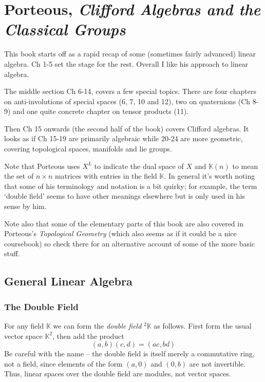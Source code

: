 \documentclass[oneside,english]{amsbook}
\numberwithin{section}{chapter}
\theoremstyle{plain}
\theoremstyle{definition}
\begin{document}
\chapter{Porteous, \emph{Clifford Algebras and the Classical Groups}}

This book starts off as a rapid recap of some (sometimes fairly advanced) linear algebra. Ch 1-5 set the stage for the rest. Overall I like his approach to linear algebra.

The middle section Ch 6-14, covers a few special topics. There are four chapters on anti-involutions of special spaces (6, 7, 10 and 12), two on quaternions (Ch 8-9) and one quite concrete chapter on tensor products (11). 

Then Ch 15 onwards (the second half of the book) covers Clifford algebras. It looks as if Ch 15-19 are primarily algebraic while 20-24 are more geometric, covering topological spaces, manifolds and lie groups.

Note that Porteous uses $X^L$ to indicate the dual space of $X$ and $\mathbb{K}(n)$ to mean the set of $n\times n$ matrices with entries in the field $\mathbb{K}$. In general it's worth noting that some of his terminology and notation is a bit quirky; for example, the term `double field' seems to have other meanings elsewhere but is only used in his sense by him. 

Note also that some of the elementary parts of this book are also covered in Porteous's \emph{Topological Geometry} (which also seems as if it could be a nice coursebook) so check there for an alternative account of some of the more basic stuff.

\section{General Linear Algebra}

\subsection{The Double Field}

For any field $\mathbb{K}$ we can form the \emph{double field} ${}^2\mathbb{K}$ as follows. First form the usual vector space $\mathbb{K}^2$, then add the product
\[
	(a, b)(c, d) = (ac, bd)
\]
Be careful with the name -- the double field is itself merely a commutative ring, not a field, since elements of the form $(a, 0)$ and $(0, b)$ are not invertible. Thus, linear spaces over the double field are modules, not vector spaces.
\end{document}
